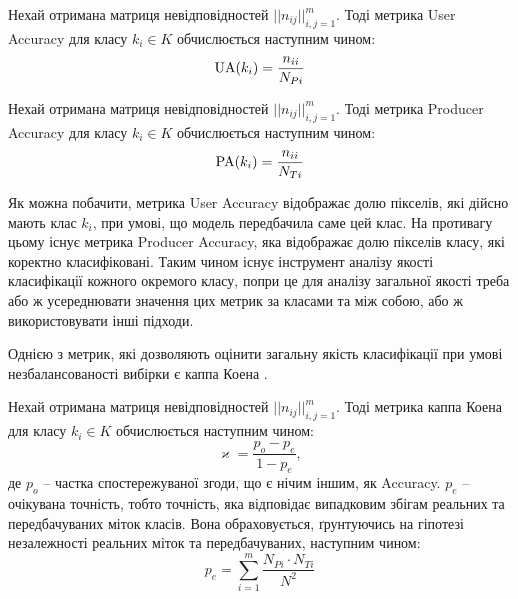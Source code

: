 \begin{definition} \label{def:user_accuracy}
    Нехай отримана матриця невідповідностей $||n_{ij}||_{i,j=1}^m$.
    Тоді метрика User Accuracy для класу $k_i \in K$ обчислюється наступним чином:
    \begin{equation*}
        \operatorname{UA}(k_i) = \frac{n_{ii}}{N_{Pi}}
    \end{equation*}
\end{definition}

\begin{definition} \label{def:prod_accuracy}
    Нехай отримана матриця невідповідностей $||n_{ij}||_{i,j=1}^m$.
    Тоді метрика Producer Accuracy для класу $k_i \in K$ обчислюється наступним чином:
    \begin{equation*}
        \operatorname{PA}(k_i) = \frac{n_{ii}}{N_{Ti}}
    \end{equation*}
\end{definition}

Як можна побачити, метрика User Accuracy відображає долю
пікселів, які дійсно мають клас $k_i$, при умові, що
модель передбачила саме цей клас. На противагу цьому існує метрика
Producer Accuracy, яка відображає долю пікселів класу, які
коректно класифіковані. Таким чином існує інструмент аналізу
якості класифікації кожного окремого класу, попри це для аналізу
загальної якості треба або ж усереднювати значення цих метрик за
класами та між собою, або ж використовувати інші підходи.

Однією з метрик, які дозволяють оцінити загальну якість
класифікації при умові незбалансованості вибірки є каппа Коена \cite{grandini2020metrics}.

\begin{definition} \label{def:kappa}
    Нехай отримана матриця невідповідностей $||n_{ij}||_{i,j=1}^m$.
    Тоді метрика каппа Коена для класу $k_i \in K$ обчислюється наступним чином:
    \begin{equation*}
        \varkappa = \frac{p_o - p_e}{1 - p_e},
    \end{equation*}
    де $p_o$ -- частка спостережуваної згоди, що є нічим іншим, як Accuracy.
    $p_e$ -- очікувана точність, тобто точність, яка відповідає
    випадковим збігам реальних та передбачуваних міток класів.
    Вона обраховується, ґрунтуючись на гіпотезі незалежності
    реальних міток та передбачуваних, наступним чином:
    \begin{equation*}
        p_e = \sum\limits_{i=1}^m \frac{N_{Pi} \cdot N_{Ti}}{N^2}
    \end{equation*}
\end{definition}

